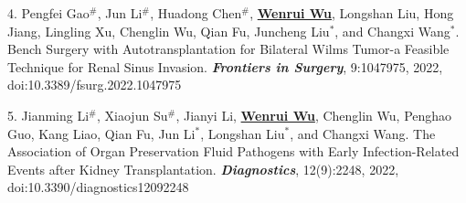 \documentclass{article}
\begin{document}
4. Pengfei Gao$^{\#}$, Jun Li$^{\#}$, Huadong Chen$^{\#}$, \underline{\textbf{Wenrui Wu}}, Longshan Liu, Hong Jiang, Lingling Xu, Chenglin Wu, Qian Fu, Juncheng Liu$^{*}$, and Changxi Wang$^{*}$. Bench Surgery with Autotransplantation for Bilateral Wilms Tumor-a Feasible Technique for Renal Sinus Invasion. \textbf{\textit{Frontiers in Surgery}}, 9:1047975, 2022, doi:10.3389/fsurg.2022.1047975

5. Jianming Li$^{\#}$, Xiaojun Su$^{\#}$, Jianyi Li, \underline{\textbf{Wenrui Wu}}, Chenglin Wu, Penghao Guo, Kang Liao, Qian Fu, Jun Li$^{*}$, Longshan Liu$^{*}$, and Changxi Wang. The Association of Organ Preservation Fluid Pathogens with Early Infection-Related Events after Kidney Transplantation. \textbf{\textit{Diagnostics}}, 12(9):2248, 2022, doi:10.3390/diagnostics12092248
\end{document}
